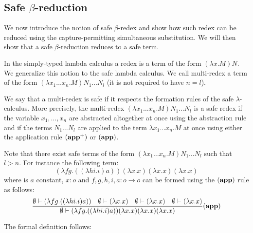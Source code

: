 \subsection{Safe $\beta$-reduction}

We now introduce the notion of safe $\beta$-redex and show how such redex can be reduced using the
capture-permitting simultaneous substitution. We will then show that
a safe $\beta$-reduction reduces to a safe term.


In the simply-typed lambda calculus a redex is a term of the form $(\lambda x . M) N$.
We generalize this notion to the safe lambda calculus. We call multi-redex a term of the form
$(\lambda x_1 \ldots x_n . M) N_1 \ldots N_l$ (it is not required to have $n=l$).


We say that a multi-redex is safe if it respects the formation rules of the safe $\lambda$-calculus. More precisely,
the multi-redex $(\lambda x_1 \ldots x_n . M) N_1 \ldots N_l$ is a safe redex if the variable $x_1,\ldots,x_n$
are abstracted altogether at once using the abstraction rule and if the terms $N_1 \ldots N_l$ are applied to the
term $\lambda x_1 \ldots x_n . M$ at once using either the application rule $\mathbf{(app^+)}$ or $\mathbf{(app)}$.

Note that there exist safe terms of the form $(\lambda x_1 \ldots x_n . M) N_1 \ldots N_l$
such that $l>n$. For instance the following term:
$$ (\lambda f g . ((\lambda h i . i) a) ) (\lambda x.x) (\lambda x.x) (\lambda x.x)$$
where is $a$ constant, $x : o$ and $f,g,h,i,a:o \rightarrow o$ can be formed using the $\mathbf{(app)}$ rule as follows:
$$ \frac{\displaystyle 
    \emptyset \vdash (\lambda f g . ((\lambda h i . i) a) )
        \quad \emptyset \vdash (\lambda x.x)
        \quad \emptyset \vdash (\lambda x.x)
        \quad \emptyset \vdash (\lambda x.x)
    }{
       \emptyset \vdash (\lambda f g . ((\lambda h i . i) a) ) (\lambda x.x) (\lambda x.x) (\lambda x.x)
    } \mathbf{(app)}
$$


The formal definition follows:

